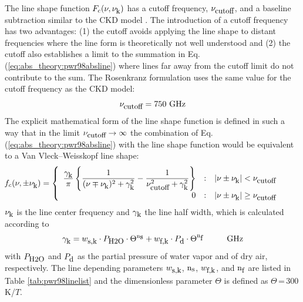 The line shape function $F_{c}(\nu,\nu_{\mbox{\rm \small k}})$ has a cutoff frequency, $\nu_{\mbox{\rm \small cutoff}}$,
and a baseline subtraction similar to the CKD model \citep{clough:89}.
The introduction of a cutoff frequency has two advantages: (1) the
cutoff avoids applying the line shape to distant frequencies where the 
line form is theoretically not well understood and (2) the cutoff also
establishes a limit to the summation in Eq. (\ref{eq:abs_theory:pwr98absline}) where lines
far away from the cutoff limit do not contribute to the sum.  
The Rosenkranz formulation uses the same value for
the cutoff frequency as the CKD model:
\begin{equation} 
 \label{cutoff}
 \nu_{\mbox{\rm \small cutoff}} = 750\mbox{ GHz}
\end{equation}
%
The explicit mathematical form of the line shape function is defined 
in such a way that in the limit $\nu_{\mbox{\rm \small cutoff}} \rightarrow \infty$ the 
combination of Eq. (\ref{eq:abs_theory:pwr98absline}) with the line shape function would 
be equivalent to a Van Vleck--Weisskopf \citep{vanvleck:45} line shape: 
\begin{equation}
 \label{eq:abs_theory:pwr98lineshape}
 \hspace*{-8mm}\shapefpm = 
   \left \{ \begin{array}{r@{\quad:\quad}l} 
   \displaystyle{\frac{\gamk}{\pi}} 
   \left \{ \displaystyle{\frac{1}{(\nu \mp \nuk)^2 + \gamk^2}} - 
   \displaystyle{\frac{1}{\nucut^2 + \gamk^2}} \right \}
   & |\nu \pm \nuk| < \nucut \\ 
   0 & |\nu \pm \nuk| \geq \nucut
                       \end{array} \right.
\end{equation}
$\nu_{\mbox{\rm \small k}}$ is the line center frequency and $\gamma_{\mbox{\rm \small k}}$ the line
half width, which is calculated according to 
\begin{equation}
 \label{eq:abs_theory:pwr98gamma}
 \gamk = \ws \cdot \phzo \cdot \Theta^{\xs} + 
         \wf \cdot \pda  \cdot \Theta^{\xf}\hspace*{10mm}\mbox{GHz}
\end{equation}
with $P_{\mbox{\rm \small H2O}}$ and $P_{\mbox{\rm \small d}}$ as the partial pressure of water vapor and of 
dry air, respectively. The line depending parameters $w_{\mbox{\rm \small s,k}}$, ${\rm n}_{\mbox{\rm \small s}}$, 
$w_{\mbox{\rm \small f,k}}$, and ${\rm n}_{\mbox{\rm \small f}}$ are listed in Table \ref{tab:pwr98linelist} and the 
dimensionless parameter $\Theta$ is defined as $\Theta$\,=\,300\,K/$T$.

